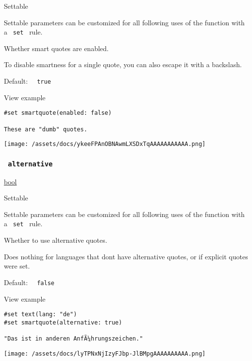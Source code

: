 {{ Settable }}

\label{parameters-enabled-settable-tooltip}
Settable parameters can be customized for all following uses of the
function with a \texttt{\ set\ } rule.

Whether smart quotes are enabled.

To disable smartness for a single quote, you can also escape it with a
backslash.

Default: \texttt{\ }{\texttt{\ true\ }}\texttt{\ }


View example

\begin{verbatim}
#set smartquote(enabled: false)

These are "dumb" quotes.
\end{verbatim}

\texttt{[image: /assets/docs/ykeeFPAnOBNAwmLXSDxTqAAAAAAAAAAA.png]}

\subsubsection{\texorpdfstring{\texttt{\ alternative\ }}{ alternative }}\label{parameters-alternative}

\href{/docs/reference/foundations/bool/}{bool}

{{ Settable }}

\label{parameters-alternative-settable-tooltip}
Settable parameters can be customized for all following uses of the
function with a \texttt{\ set\ } rule.

Whether to use alternative quotes.

Does nothing for languages that don\textquotesingle t have alternative
quotes, or if explicit quotes were set.

Default: \texttt{\ }{\texttt{\ false\ }}\texttt{\ }


View example

\begin{verbatim}
#set text(lang: "de")
#set smartquote(alternative: true)

"Das ist in anderen AnfÃ¼hrungszeichen."
\end{verbatim}

\texttt{[image: /assets/docs/lyTPNxNjIzyFJbp-JlBMpgAAAAAAAAAA.png]}

